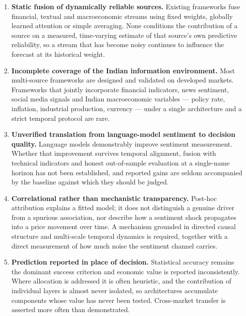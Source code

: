 \begin{enumerate}[label=\textbf{G\arabic*.}]
\item \textbf{Static fusion of dynamically reliable sources.} Existing frameworks fuse
financial, textual and macroeconomic streams using fixed weights, globally learned attention or
simple averaging. None conditions the contribution of a source on a measured, time-varying
estimate of that source's own predictive reliability, so a stream that has become noisy
continues to influence the forecast at its historical weight.

\item \textbf{Incomplete coverage of the Indian information environment.} Most multi-source
frameworks are designed and validated on developed markets. Frameworks that jointly incorporate
financial indicators, news sentiment, social media signals and Indian macroeconomic variables
--- policy rate, inflation, industrial production, currency --- under a single architecture and
a strict temporal protocol are rare.

\item \textbf{Unverified translation from language-model sentiment to decision quality.}
Language models demonstrably improve sentiment measurement. Whether that improvement survives
temporal alignment, fusion with technical indicators and honest out-of-sample evaluation at a
single-name horizon has not been established, and reported gains are seldom accompanied by the
baseline against which they should be judged.

\item \textbf{Correlational rather than mechanistic transparency.} Post-hoc attribution explains
a fitted model; it does not distinguish a genuine driver from a spurious association, nor
describe how a sentiment shock propagates into a price movement over time. A mechanism grounded
in directed causal structure and multi-scale temporal dynamics is required, together with a
direct measurement of how much noise the sentiment channel carries.

\item \textbf{Prediction reported in place of decision.} Statistical accuracy remains the
dominant success criterion and economic value is reported inconsistently. Where allocation is
addressed it is often heuristic, and the contribution of individual layers is almost never
isolated, so architectures accumulate components whose value has never been tested. Cross-market
transfer is asserted more often than demonstrated.
\end{enumerate}

